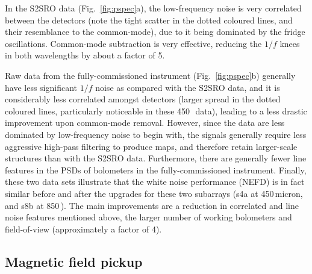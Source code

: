 \documentclass[useAMS,usenatbib,nofootinbib]{mn2e}
\begin{document}
In the S2SRO data (Fig.~\ref{fig:pspec}a), the low-frequency noise is
very correlated between the detectors (note the tight scatter in the
dotted coloured lines, and their resemblance to the common-mode), due
to it being dominated by the fridge oscillations. Common-mode
subtraction is very effective, reducing the $1/f$ knees in both
wavelengths by about a factor of 5.

Raw data from the fully-commissioned instrument
(Fig.~\ref{fig:pspec}b) generally have less significant $1/f$ noise as
compared with the S2SRO data, and it is considerably less correlated
amongst detectors (larger spread in the dotted coloured lines,
particularly noticeable in these 450\,\micron\ data), leading to a
less drastic improvement upon common-mode removal. However, since the
data are less dominated by low-frequency noise to begin with, the
signals generally require less aggressive high-pass filtering to
produce maps, and therefore retain larger-scale structures than with
the S2SRO data. Furthermore, there are generally fewer line features
in the PSDs of bolometers in the fully-commissioned
instrument. Finally, these two data sets illustrate that the white
noise performance (NEFD) is in fact similar before and after the
upgrades for these two subarrays (s4a at 450\,micron, and s8b at
850\,\micron). The main improvements are a reduction in correlated and
line noise features mentioned above, the larger number of working
bolometers and field-of-view (approximately a factor of 4).

\subsection{Magnetic field pickup}
\label{sec:magpickup}
\end{document}
